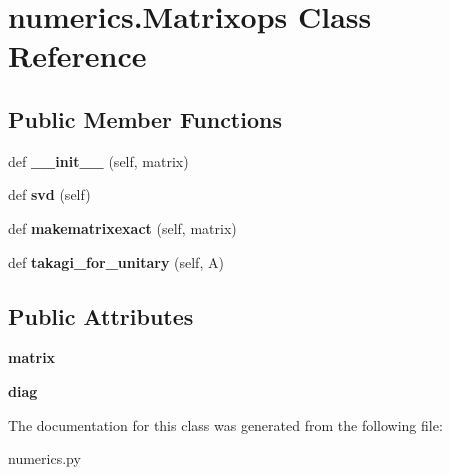 \hypertarget{classnumerics_1_1Matrixops}{}\section{numerics.\+Matrixops Class Reference}
\label{classnumerics_1_1Matrixops}
\subsection*{Public Member Functions}
\begin{DoxyCompactItemize}
\item 
\mbox{\label{classnumerics_1_1Matrixops_a0d60d9d74a8d73e41d8bb640124a00f5}} 
def {\bfseries \+\_\+\+\_\+init\+\_\+\+\_\+} (self, matrix)
\item 
\mbox{\label{classnumerics_1_1Matrixops_a46bd24f7862446a9c1352d7eb5d123ac}} 
def {\bfseries svd} (self)
\item 
\mbox{\label{classnumerics_1_1Matrixops_aa3afcb051d04220400615437dc5c805e}} 
def {\bfseries makematrixexact} (self, matrix)
\item 
\mbox{\label{classnumerics_1_1Matrixops_a28d7e45332dd84df60001f8dfe577125}} 
def {\bfseries takagi\+\_\+for\+\_\+unitary} (self, A)
\end{DoxyCompactItemize}
\subsection*{Public Attributes}
\begin{DoxyCompactItemize}
\item 
\mbox{\label{classnumerics_1_1Matrixops_a486923bb7ebacef208d31f619501ba79}} 
{\bfseries matrix}
\item 
\mbox{\label{classnumerics_1_1Matrixops_aec6292b511ad362620aa9d78e7c4e6b0}} 
{\bfseries diag}
\end{DoxyCompactItemize}


The documentation for this class was generated from the following file\+:\begin{DoxyCompactItemize}
\item 
numerics.\+py\end{DoxyCompactItemize}
